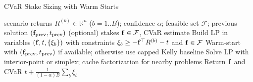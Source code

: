 \begin{algorithm}[t]
  \caption{CVaR Stake Sizing with Warm Starts}
  \label{alg:cvar-solve}
  \begin{algorithmic}[1]
    \Require scenario returns $R^{(b)}\in\mathbb{R}^n$ ($b=1..B$); confidence $\alpha$; feasible set $\mathcal F$; previous solution $(\mathbf{f}_{\text{prev}},t_{\text{prev}})$ (optional)
    \Ensure stakes $\mathbf{f}\in\mathcal F$, CVaR estimate
    \State Build LP in variables $(\mathbf{f},t,\{\xi_b\})$ with constraints $\xi_b\ge-\mathbf{f}^\top R^{(b)}-t$ and $\mathbf{f}\in\mathcal F$
    \State Warm‑start with $(\mathbf{f}_{\text{prev}},t_{\text{prev}})$ if available; otherwise use capped Kelly baseline
    \State Solve LP with interior‑point or simplex; cache factorization for nearby problems
    \State Return $\mathbf{f}$ and CVaR $t+\frac{1}{(1-\alpha)B}\sum_b \xi_b$
  \end{algorithmic}
\end{algorithm}
